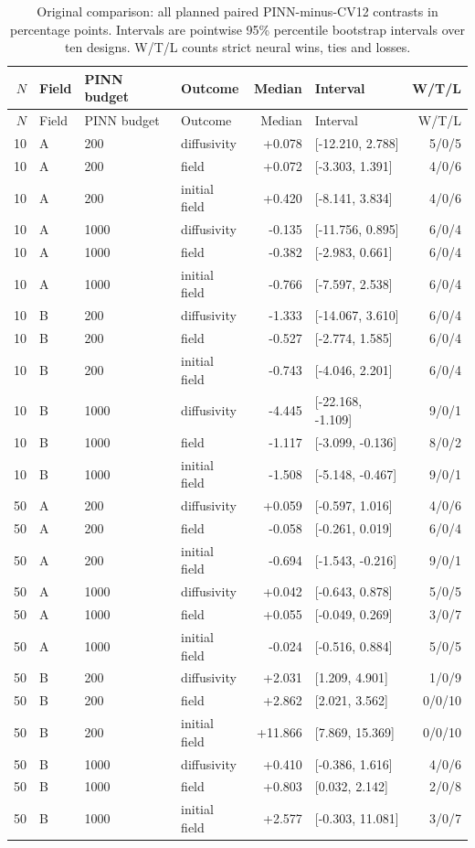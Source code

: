 \normalsize
\small
\begin{longtable}{rlllrlr}
\caption{Original comparison: all planned paired PINN-minus-CV12 contrasts in percentage points. Intervals are pointwise 95\% percentile bootstrap intervals over ten designs. W/T/L counts strict neural wins, ties and losses.}\label{tab:originalpaired}\\
\toprule
$N$ & Field & PINN budget & Outcome & Median & Interval & W/T/L\\\midrule
\endfirsthead
\toprule
$N$ & Field & PINN budget & Outcome & Median & Interval & W/T/L\\\midrule
\endhead
10 & A & 200 & diffusivity & +0.078 & [-12.210, 2.788] & 5/0/5\\
10 & A & 200 & field & +0.072 & [-3.303, 1.391] & 4/0/6\\
10 & A & 200 & initial field & +0.420 & [-8.141, 3.834] & 4/0/6\\
10 & A & 1000 & diffusivity & -0.135 & [-11.756, 0.895] & 6/0/4\\
10 & A & 1000 & field & -0.382 & [-2.983, 0.661] & 6/0/4\\
10 & A & 1000 & initial field & -0.766 & [-7.597, 2.538] & 6/0/4\\
10 & B & 200 & diffusivity & -1.333 & [-14.067, 3.610] & 6/0/4\\
10 & B & 200 & field & -0.527 & [-2.774, 1.585] & 6/0/4\\
10 & B & 200 & initial field & -0.743 & [-4.046, 2.201] & 6/0/4\\
10 & B & 1000 & diffusivity & -4.445 & [-22.168, -1.109] & 9/0/1\\
10 & B & 1000 & field & -1.117 & [-3.099, -0.136] & 8/0/2\\
10 & B & 1000 & initial field & -1.508 & [-5.148, -0.467] & 9/0/1\\
50 & A & 200 & diffusivity & +0.059 & [-0.597, 1.016] & 4/0/6\\
50 & A & 200 & field & -0.058 & [-0.261, 0.019] & 6/0/4\\
50 & A & 200 & initial field & -0.694 & [-1.543, -0.216] & 9/0/1\\
50 & A & 1000 & diffusivity & +0.042 & [-0.643, 0.878] & 5/0/5\\
50 & A & 1000 & field & +0.055 & [-0.049, 0.269] & 3/0/7\\
50 & A & 1000 & initial field & -0.024 & [-0.516, 0.884] & 5/0/5\\
50 & B & 200 & diffusivity & +2.031 & [1.209, 4.901] & 1/0/9\\
50 & B & 200 & field & +2.862 & [2.021, 3.562] & 0/0/10\\
50 & B & 200 & initial field & +11.866 & [7.869, 15.369] & 0/0/10\\
50 & B & 1000 & diffusivity & +0.410 & [-0.386, 1.616] & 4/0/6\\
50 & B & 1000 & field & +0.803 & [0.032, 2.142] & 2/0/8\\
50 & B & 1000 & initial field & +2.577 & [-0.303, 11.081] & 3/0/7\\
\bottomrule
\end{longtable}

